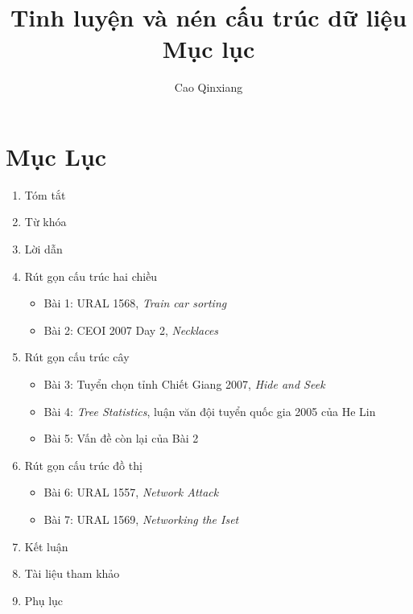 \documentclass[11pt]{article}
\title{Tinh luyện và nén cấu trúc dữ liệu\\{\large Mục lục}}
\author{Cao Qinxiang}
\date{}
\begin{document}
\maketitle


\section*{Mục Lục}

\begin{enumerate}
  \item Tóm tắt 
  \item Từ khóa 
  \item Lời dẫn 
  \item Rút gọn cấu trúc hai chiều 
  \begin{itemize}
    \item Bài 1: URAL 1568, \emph{Train car sorting} 
    \item Bài 2: CEOI 2007 Day 2, \emph{Necklaces} 
  \end{itemize}
  \item Rút gọn cấu trúc cây 
  \begin{itemize}
    \item Bài 3: Tuyển chọn tỉnh Chiết Giang 2007, \emph{Hide and Seek}
    \item Bài 4: \emph{Tree Statistics}, luận văn đội tuyển quốc gia 2005
    của He Lin 
    \item Bài 5: Vấn đề còn lại của Bài 2 
  \end{itemize}
  \item Rút gọn cấu trúc đồ thị 
  \begin{itemize}
    \item Bài 6: URAL 1557, \emph{Network Attack} 
    \item Bài 7: URAL 1569, \emph{Networking the Iset} 
  \end{itemize}
  \item Kết luận 
  \item Tài liệu tham khảo 
  \item Phụ lục 
\end{enumerate}
\end{document}
